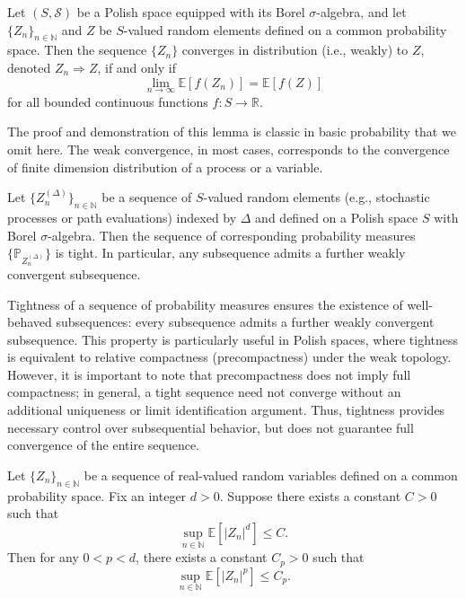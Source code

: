 \documentclass[10pt]{article}
\numberwithin{figure}{section}
\begin{document}
\begin{alemma}\label{app:lem1}
Let $(S, \mathcal{S})$ be a Polish space equipped with its Borel $\sigma$-algebra, and let $\{Z_n\}_{n \in \mathbb{N}}$ and $Z$ be $S$-valued random elements defined on a common probability space. Then the sequence $\{Z_n\}$ converges in distribution (i.e., weakly) to $Z$, denoted $Z_n \Rightarrow Z$, if and only if
\[
\lim_{n \to \infty} \mathbb{E}[f(Z_n)] = \mathbb{E}[f(Z)]
\]
for all bounded continuous functions $f : S \to \mathbb{R}$.
\end{alemma}
The proof and demonstration of this lemma is classic in basic probability that we omit here. The weak convergence, in most cases, corresponds to the convergence of finite dimension distribution of a process or a variable. 
\smallskip
\begin{alemma}\label{app:lem2}
Let $\{Z^{(\Delta)}_n\}_{n \in \mathbb{N}}$ be a sequence of $S$-valued random elements (e.g., stochastic processes or path evaluations) indexed by $\Delta$ and defined on a Polish space $S$ with Borel $\sigma$-algebra. Then the sequence of corresponding probability measures $\{\mathbb{P}_{Z^{(\Delta)}_n}\}$ is tight. In particular, any subsequence admits a further weakly convergent subsequence.
\end{alemma}
Tightness of a sequence of probability measures ensures the existence of well-behaved subsequences: every subsequence admits a further weakly convergent subsequence. This property is particularly useful in Polish spaces, where tightness is equivalent to relative compactness (precompactness) under the weak topology.
However, it is important to note that precompactness does not imply full compactness; in general, a tight sequence need not converge without an additional uniqueness or limit identification argument. Thus, tightness provides necessary control over subsequential behavior, but does not guarantee full convergence of the entire sequence.
\smallskip
\begin{alemma}\label{app:lem3}
Let $\{Z_n\}_{n \in \mathbb{N}}$ be a sequence of real-valued random variables defined on a common probability space. Fix an integer $d > 0$. Suppose there exists a constant $C > 0$ such that
\[
\sup_{n \in \mathbb{N}} \mathbb{E}[|Z_n|^d] \leq C.
\]
Then for any \( 0 < p < d \), there exists a constant \( C_p > 0 \) such that
\[
\sup_{n \in \mathbb{N}} \mathbb{E}[|Z_n|^p] \leq C_p.
\]
\end{alemma}
\end{document}
